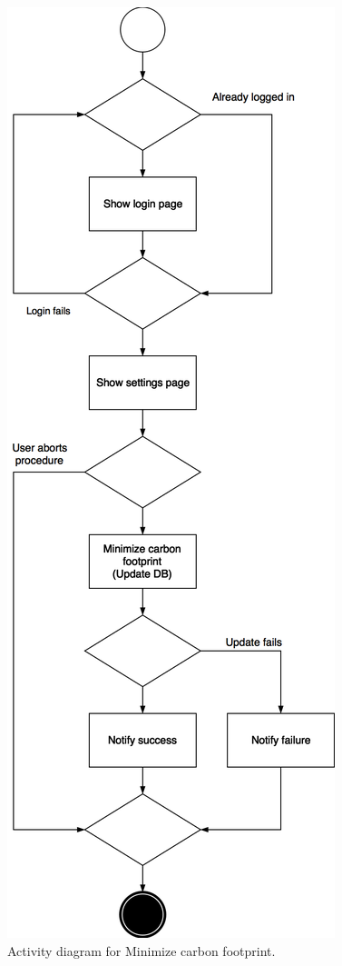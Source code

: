 \documentclass{article}
\begin{document}
	\begin{figure}[h!]
		\bigskip
		\centering
		\includegraphics[scale=0.25]{img/diagrams/minimize_carbon_footprint_ad.png}
		\caption{Activity diagram for Minimize carbon footprint.}
	\end{figure}
	\newpage
\end{document}
